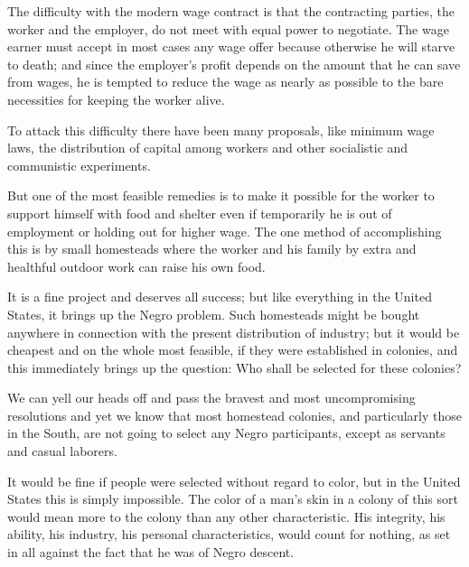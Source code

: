 \documentclass[letterpaper,10pt,english]{jupyterBook}
\begin{document}
\sphinxAtStartPar
The difficulty with the modern wage contract is that the contracting parties, the worker and the employer, do not meet with equal power to negotiate. The wage earner must accept in most cases any wage offer because otherwise he will starve to death; and since the employer’s profit depends on the amount that he can save from wages, he is tempted to reduce the wage as nearly as possible to the bare necessities for keeping the worker alive.

\sphinxAtStartPar
To attack this difficulty there have been many proposals, like minimum wage laws, the distribution of capital among workers and other socialistic and communistic experiments.

\sphinxAtStartPar
But one of the most feasible remedies is to make it possible for the worker to support himself with food and shelter even if temporarily he is out of employment or holding out for higher wage. The one method of accomplishing this is by small homesteads where the worker and his family by extra and healthful outdoor work can raise his own food.

\sphinxAtStartPar
It is a fine project and deserves all success; but like everything in the United States, it brings up the Negro problem. Such homesteads might be bought anywhere in connection with the present distribution of industry; but it would be cheapest and on the whole most feasible, if they were established in colonies, and this immediately brings up the question: Who shall be selected for these colonies?

\sphinxAtStartPar
We can yell our heads off and pass the bravest and most uncompromising resolutions and yet we know that most homestead colonies, and particularly those in the South, are not going to select any Negro participants, except as servants and casual laborers.

\sphinxAtStartPar
It would be fine if people were selected without regard to color, but in the United States this is simply impossible. The color of a man’s skin in a colony of this sort would mean more to the colony than any other characteristic. His integrity, his ability, his industry, his personal characteristics, would count for nothing, as set in all against the fact that he was of Negro descent.
\end{document}
